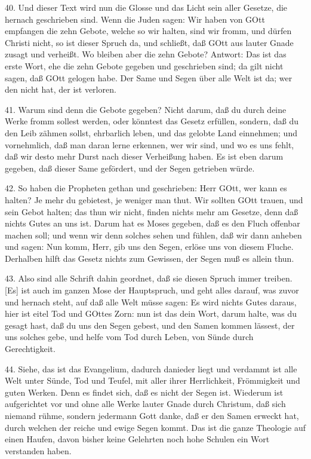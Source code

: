 40. Und dieser Text wird nun die Glosse und das Licht sein aller Gesetze, die hernach geschrieben sind. Wenn die Juden sagen: Wir haben von GOtt empfangen die zehn Gebote, welche so wir halten, sind wir fromm, und dürfen Christi nicht, so ist dieser Spruch da, und schließt, daß GOtt aus lauter Gnade zusagt und verheißt. Wo bleiben aber die zehn Gebote? Antwort: Das ist das erste Wort, ehe die zehn Gebote gegeben und geschrieben sind; da gilt nicht sagen, daß GOtt gelogen habe. Der Same und Segen über alle Welt ist da; wer den nicht hat, der ist verloren.

41. Warum sind denn die Gebote gegeben? Nicht darum, daß du durch deine Werke fromm sollest werden, oder könntest das Gesetz erfüllen, sondern, daß du den Leib zähmen sollst, ehrbarlich leben, und das gelobte Land einnehmen; und vornehmlich, daß man daran lerne erkennen, wer wir sind, und wo es uns fehlt, daß wir desto mehr Durst nach dieser Verheißung haben. Es ist eben darum gegeben, daß dieser Same gefördert, und der Segen getrieben würde.

42. So haben die Propheten gethan und geschrieben: Herr GOtt, wer kann es halten? Je mehr du gebietest, je weniger man thut. Wir sollten GOtt trauen, und sein Gebot halten; das thun wir nicht, finden nichts mehr am Gesetze, denn daß nichts Gutes an uns ist. Darum hat es Moses gegeben, daß es den Fluch offenbar machen soll; und wenn wir denn solches sehen und fühlen, daß wir dann anheben und sagen: Nun komm, Herr, gib uns den Segen, erlöse uns von diesem Fluche. Derhalben hilft das Gesetz nichts zum Gewissen, der Segen muß es allein thun.

43. Also sind alle Schrift dahin geordnet, daß sie diesen Spruch immer treiben. [Es] ist auch im ganzen Mose der Hauptspruch, und geht alles darauf, was zuvor und hernach steht, auf daß alle Welt müsse sagen: Es wird nichts Gutes daraus, hier ist eitel Tod und GOttes Zorn: nun ist das dein Wort, darum halte, was
du gesagt hast, daß du uns den Segen gebest, und den Samen kommen lässest, der uns solches gebe, und helfe vom Tod durch Leben, von Sünde durch Gerechtigkeit.

44. Siehe, das ist das Evangelium, dadurch danieder liegt und verdammt ist alle Welt unter Sünde, Tod und Teufel, mit aller ihrer Herrlichkeit, Frömmigkeit und guten Werken. Denn es findet sich, daß es nicht der Segen ist. Wiederum ist aufgerichtet vor und ohne alle Werke lauter Gnade durch Christum, daß sich niemand rühme, sondern jedermann Gott danke, daß er den Samen erweckt hat, durch welchen der reiche und ewige Segen kommt. Das ist die ganze Theologie auf einen Haufen, davon bisher keine Gelehrten noch hohe Schulen ein Wort verstanden haben.


